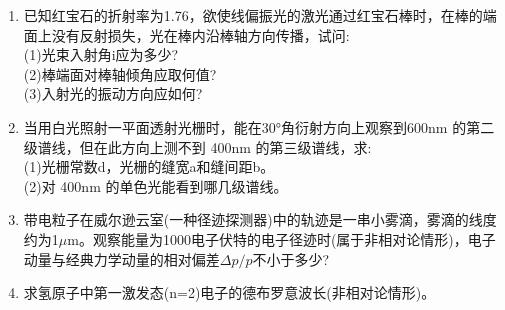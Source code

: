\begin{enumerate}
(2)若用光栅常数$d=1.0*10^{-3}cm$的光栅替换单缝，其它条件和上一问相同，求相应两个第一级主极大之间的距离。
\item 已知红宝石的折射率为1.76，欲使线偏振光的激光通过红宝石棒时，在棒的端面上没有反射损失，光在棒内沿棒轴方向传播，试问:\\
(1)光束入射角i应为多少?\\
(2)棒端面对棒轴倾角应取何值?\\
(3)入射光的振动方向应如何?
\item 当用白光照射一平面透射光栅时，能在30°角衍射方向上观察到600nm 的第二级谱线，但在此方向上测不到 400nm 的第三级谱线，求:\\
(1)光栅常数d，光栅的缝宽a和缝间距b。\\
(2)对 400nm 的单色光能看到哪几级谱线。
\item 带电粒子在威尔逊云室(一种径迹探测器)中的轨迹是一串小雾滴，雾滴的线度约为1$\mu$m。观察能量为1000电子伏特的电子径迹时(属于非相对论情形)，电子动量与经典力学动量的相对偏差$\Delta p/p$不小于多少?
\item 求氢原子中第一激发态(n=2)电子的德布罗意波长(非相对论情形)。
\end{enumerate}